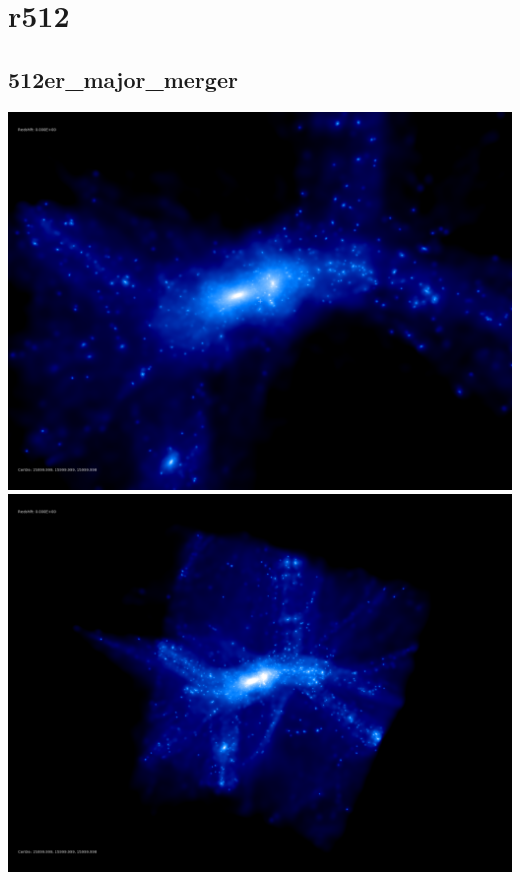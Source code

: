\section{r512} 

\subsection{512er\_major\_merger}
\includegraphics[scale=0.2]{r512/512er_major_merger/corezoom.png} \\
\includegraphics[scale=0.2]{r512/512er_major_merger/screenshot_snapshot_200.png} \\
